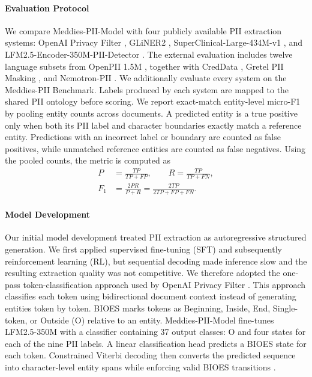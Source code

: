 \documentclass[11pt]{article}
\begin{document}
\paragraph{Evaluation Protocol} We compare Meddies-PII-Model with four publicly available PII extraction systems: OpenAI Privacy Filter \cite{openai2026privacyfilter}, GLiNER2 \cite{zaratiana2025gliner2efficientmultitaskinformation}, SuperClinical-Large-434M-v1 \cite{openmed-pii-2026}, and LFM2.5-Encoder-350M-PII-Detector \cite{liquidai2026lfm25pii}. The external evaluation includes twelve language subsets from OpenPII 1.5M \cite{ai4privacy_openpii_1_5m_2026}, together with CredData \cite{sr-cred21}, Gretel PII Masking \cite{gretel-pii-docs-en-v1}, and Nemotron-PII \cite{nemotron-pii}. We additionally evaluate every system on the Meddies-PII Benchmark. Labels produced by each system are mapped to the shared PII ontology before scoring. We report exact-match entity-level micro-F1 by pooling entity counts across documents. A predicted entity is a true positive only when both its PII label and character boundaries exactly match a reference entity. Predictions with an incorrect label or boundary are counted as false positives, while unmatched reference entities are counted as false negatives. Using the pooled counts, the metric is computed as
\begin{equation}
\begin{aligned}
P &= \frac{TP}{TP+FP}, \qquad
R = \frac{TP}{TP+FN}, \\
F_1 &= \frac{2PR}{P+R}
= \frac{2TP}{2TP+FP+FN}.
\end{aligned}
\end{equation}

\paragraph{Model Development} Our initial model development treated PII extraction as autoregressive structured generation. We first applied supervised fine-tuning (SFT) and subsequently reinforcement learning (RL), but sequential decoding made inference slow and the resulting extraction quality was not competitive. We therefore adopted the one-pass token-classification approach used by OpenAI Privacy Filter \cite{openai2026privacyfilter}. This approach classifies each token using bidirectional document context instead of generating entities token by token. BIOES marks tokens as Beginning, Inside, End, Single-token, or Outside (O) relative to an entity. Meddies-PII-Model fine-tunes LFM2.5-350M with a classifier containing 37 output classes: O and four states for each of the nine PII labels. A linear classification head predicts a BIOES state for each token. Constrained Viterbi decoding then converts the predicted sequence into character-level entity spans while enforcing valid BIOES transitions \cite{lester-etal-2020-constrained}.
\end{document}
